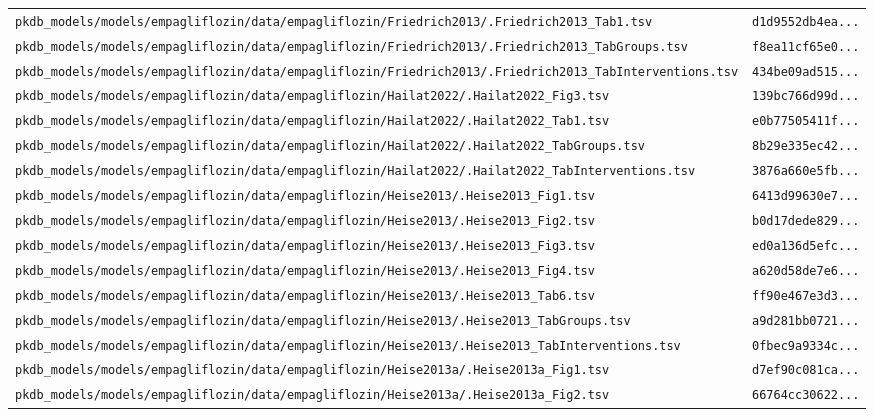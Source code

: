 \documentclass{article}
\begin{document}
\begin{longtable}{ll}
\texttt{pkdb\_models/models/empagliflozin/data/empagliflozin/Friedrich2013/.Friedrich2013\_Tab1.tsv} & \texttt{d1d9552db4ea...} \\
\texttt{pkdb\_models/models/empagliflozin/data/empagliflozin/Friedrich2013/.Friedrich2013\_TabGroups.tsv} & \texttt{f8ea11cf65e0...} \\
\texttt{pkdb\_models/models/empagliflozin/data/empagliflozin/Friedrich2013/.Friedrich2013\_TabInterventions.tsv} & \texttt{434be09ad515...} \\
\texttt{pkdb\_models/models/empagliflozin/data/empagliflozin/Hailat2022/.Hailat2022\_Fig3.tsv} & \texttt{139bc766d99d...} \\
\texttt{pkdb\_models/models/empagliflozin/data/empagliflozin/Hailat2022/.Hailat2022\_Tab1.tsv} & \texttt{e0b77505411f...} \\
\texttt{pkdb\_models/models/empagliflozin/data/empagliflozin/Hailat2022/.Hailat2022\_TabGroups.tsv} & \texttt{8b29e335ec42...} \\
\texttt{pkdb\_models/models/empagliflozin/data/empagliflozin/Hailat2022/.Hailat2022\_TabInterventions.tsv} & \texttt{3876a660e5fb...} \\
\texttt{pkdb\_models/models/empagliflozin/data/empagliflozin/Heise2013/.Heise2013\_Fig1.tsv} & \texttt{6413d99630e7...} \\
\texttt{pkdb\_models/models/empagliflozin/data/empagliflozin/Heise2013/.Heise2013\_Fig2.tsv} & \texttt{b0d17dede829...} \\
\texttt{pkdb\_models/models/empagliflozin/data/empagliflozin/Heise2013/.Heise2013\_Fig3.tsv} & \texttt{ed0a136d5efc...} \\
\texttt{pkdb\_models/models/empagliflozin/data/empagliflozin/Heise2013/.Heise2013\_Fig4.tsv} & \texttt{a620d58de7e6...} \\
\texttt{pkdb\_models/models/empagliflozin/data/empagliflozin/Heise2013/.Heise2013\_Tab6.tsv} & \texttt{ff90e467e3d3...} \\
\texttt{pkdb\_models/models/empagliflozin/data/empagliflozin/Heise2013/.Heise2013\_TabGroups.tsv} & \texttt{a9d281bb0721...} \\
\texttt{pkdb\_models/models/empagliflozin/data/empagliflozin/Heise2013/.Heise2013\_TabInterventions.tsv} & \texttt{0fbec9a9334c...} \\
\texttt{pkdb\_models/models/empagliflozin/data/empagliflozin/Heise2013a/.Heise2013a\_Fig1.tsv} & \texttt{d7ef90c081ca...} \\
\texttt{pkdb\_models/models/empagliflozin/data/empagliflozin/Heise2013a/.Heise2013a\_Fig2.tsv} & \texttt{66764cc30622...} \\

\end{longtable}
\end{document}
